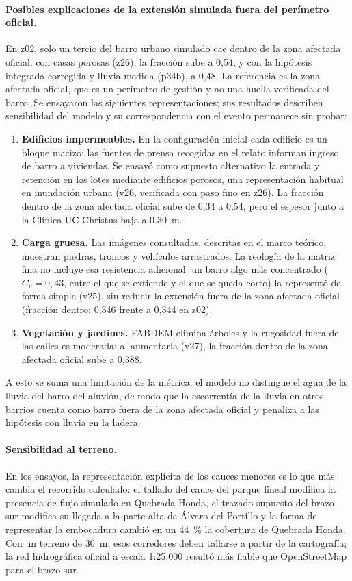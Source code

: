 \paragraph{Posibles explicaciones de la extensión simulada fuera del perímetro oficial.} En z02, solo un tercio del barro urbano simulado cae dentro de la zona afectada oficial; con casas porosas (z26), la fracción sube a 0,54, y con la hipótesis integrada corregida y lluvia medida (p34b), a 0,48. La referencia es la zona afectada oficial, que es un perímetro de gestión y no una huella verificada del barro. Se ensayaron las siguientes representaciones; sus resultados describen sensibilidad del modelo y su correspondencia con el evento permanece sin probar:
\begin{enumerate}
\item \textbf{Edificios impermeables.} En la configuración inicial cada edificio es un bloque macizo; las fuentes de prensa recogidas en el relato informan ingreso de barro a viviendas. Se ensayó como supuesto alternativo la entrada y retención en los lotes mediante edificios porosos, una representación habitual en inundación urbana \citep{schubert2012} (v26, verificada con paso fino en z26). La fracción dentro de la zona afectada oficial sube de 0,34 a 0,54, pero el espesor junto a la Clínica UC Christus baja a \SI{0,30}{m}.
\item \textbf{Carga gruesa.} Las imágenes consultadas, descritas en el marco teórico, muestran piedras, troncos y vehículos arrastrados. La reología de la matriz fina no incluye esa resistencia adicional; un barro algo más concentrado ($C_v=0{,}43$, entre el que se extiende y el que se queda corto) la representó de forma simple (v25), sin reducir la extensión fuera de la zona afectada oficial (fracción dentro: 0,346 frente a 0,344 en z02).
\item \textbf{Vegetación y jardines.} FABDEM elimina árboles y la rugosidad fuera de las calles es moderada; al aumentarla (v27), la fracción dentro de la zona afectada oficial sube a 0,388.
\end{enumerate}
A esto se suma una limitación de la métrica: el modelo no distingue el agua de la lluvia del barro del aluvión, de modo que la escorrentía de la lluvia en otros barrios cuenta como barro fuera de la zona afectada oficial y penaliza a las hipótesis con lluvia en la ladera.

\paragraph{Sensibilidad al terreno.} En los ensayos, la representación explícita de los cauces menores es lo que más cambia el recorrido calculado: el tallado del cauce del parque lineal modifica la presencia de flujo simulado en Quebrada Honda, el trazado supuesto del brazo sur modifica su llegada a la parte alta de Álvaro del Portillo y la forma de representar la embocadura cambió en un \SI{44}{\percent} la cobertura de Quebrada Honda. Con un terreno de \SI{30}{m}, esos corredores deben tallarse a partir de la cartografía; la red hidrográfica oficial a escala 1:25.000 resultó más fiable que OpenStreetMap para el brazo sur.

